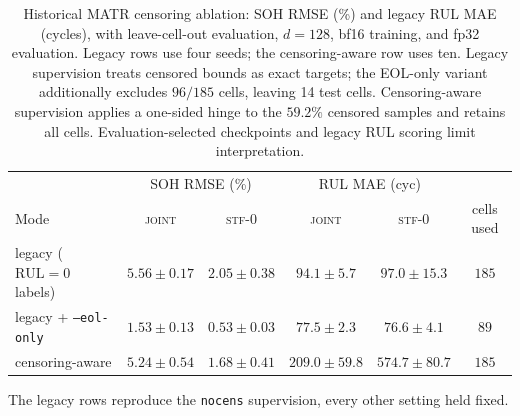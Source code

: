 \documentclass{article}
\begin{document}
\begin{table}[t]
\centering
\caption{Historical MATR censoring ablation: SOH RMSE (\%) and legacy RUL MAE (cycles), with leave-cell-out evaluation, $d=128$, bf16 training, and fp32 evaluation. Legacy rows use four seeds; the censoring-aware row uses ten. Legacy supervision treats censored bounds as exact targets; the EOL-only variant additionally excludes $96/185$ cells, leaving 14 test cells. Censoring-aware supervision applies a one-sided hinge to the $59.2\%$ censored samples and retains all cells. Evaluation-selected checkpoints and legacy RUL scoring limit interpretation.}
\label{tab:cens_ablation}
\footnotesize
\begin{tabular}{lccccc}
\toprule
 & \multicolumn{2}{c}{SOH RMSE (\%)} & \multicolumn{2}{c}{RUL MAE (cyc)} & \\
Mode & \textsc{joint} & \textsc{stf-0} & \textsc{joint} & \textsc{stf-0} & cells used \\
\midrule
legacy ($\text{RUL}{=}0$ labels) & $5.56\pm0.17$ & $2.05\pm0.38$ & $94.1\pm5.7$ & $97.0\pm15.3$ & $185$ \\
legacy + \texttt{--eol-only} & $1.53\pm0.13$ & $0.53\pm0.03$ & $77.5\pm2.3$ & $76.6\pm4.1$ & $89$ \\
censoring-aware & $5.24\pm0.54$ & $1.68\pm0.41$ & $209.0\pm59.8$ & $574.7\pm80.7$ & $185$ \\
\bottomrule
\end{tabular}\par
\vspace{1pt}
{\footnotesize The legacy rows reproduce the \texttt{nocens} supervision, every other setting held fixed.}
\end{table}
\end{document}
